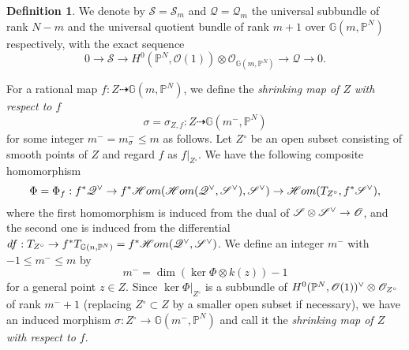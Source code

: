 \documentclass[a4paper,12pt]{amsart}
\theoremstyle{plain}
\theoremstyle{definition}
\newtheorem{defn}[defn]{Definition}
\begin{document}
\begin{defn}\label{thm:def-shr-Zf}
  We denote by ${\mathscr{S}} = {\mathscr{S}}_{m}$ and ${\mathscr{Q}} = {\mathscr{Q}}_{m}$ the universal subbundle of rank $N-m$ and the universal quotient bundle of rank $m+1$ over ${{\mathbb{G}}(m,{{\mathbb{P}}^N})}$ respectively, 
  with the exact sequence
  \begin{equation}\label{eq:Euler0}
    0 \rightarrow {\mathscr{S}} \rightarrow H^0({{\mathbb{P}}^N}, {\mathscr{O}}(1))\otimes {\mathscr{O}}_{{\mathbb{G}}(m,{{\mathbb{P}}^N})} \rightarrow {\mathscr{Q}} \rightarrow 0.
  \end{equation}

  For a rational map $f: Z \dashrightarrow {\mathbb{G}}(m, {{\mathbb{P}}^N})$,
  we define the \emph{shrinking map of $Z$ with respect to $f$}
  \[
  \sigma = \sigma_{Z, f} : Z \dashrightarrow {\mathbb{G}}(m^{-}, {{\mathbb{P}}^N})
  \]
  for some integer $m^{-} = m^{-}_{\sigma} {\leqslant} m$ as follows.
  Let ${{Z{^\circ}}}$ be an open subset consisting of smooth points of $Z$ and regard $f$ as $f|_{{Z{^\circ}}}$.
  We have the following composite homomorphism
  \begin{equation*}    \Phi = \Phi_f: f^*{\mathscr{Q}}\spcheck \rightarrow f^*{\mathscr{H}om}({\mathscr{H}om}({\mathscr{Q}}\spcheck , {\mathscr{S}}\spcheck), {\mathscr{S}}\spcheck)
    \rightarrow {\mathscr{H}om}(T_{{Z{^\circ}}}, f^*{\mathscr{S}}\spcheck),
  \end{equation*}
  where
  the first homomorphism
  is induced from the dual of
  ${\mathscr{S}} \otimes {\mathscr{S}}\spcheck \rightarrow {\mathscr{O}}$,
  and the second one
  is induced from the differential
  $df : T_{{Z{^\circ}}} \rightarrow f^*T_{{\mathbb{G}}(n, {\mathbb{P}}^N)} = f^*{\mathscr{H}om}({\mathscr{Q}}\spcheck , {\mathscr{S}}\spcheck)$.
  We define an integer $m^{-}$
  with $-1 {\leqslant} m^- {\leqslant} m$ by
  \begin{equation*}    m^{-} = \dim (\ker \Phi \otimes k(z)) - 1
  \end{equation*}
  for a general point $z \in Z$.
  Since $\ker \Phi|_{{Z{^\circ}}}$ is a subbundle of
  $H^0({{\mathbb{P}}^N}, {\mathscr{O}}(1))\spcheck \otimes {\mathscr{O}}_{{Z{^\circ}}}$
  of rank $m^{-}+1$
  (replacing ${{Z{^\circ}}} \subset Z$ by a smaller open subset if necessary),
  we have an induced morphism
  $\sigma: {{Z{^\circ}}} \rightarrow  {\mathbb{G}}(m^{-}, {{\mathbb{P}}^N})$
  and call it the \emph{shrinking map of $Z$ with respect to $f$}.
\end{defn}
\end{document}
